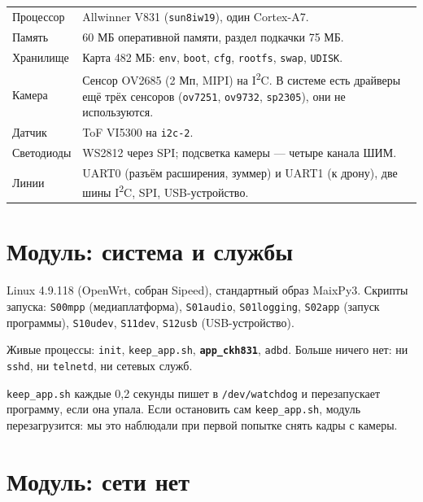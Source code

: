 \begin{tabularx}{\textwidth}{@{}p{3.3cm} Y@{}}
\toprule
{} &  \\ \midrule
Процессор & Allwinner V831 (\texttt{sun8iw19}), один Cortex-A7. \pr{} \\
Память & 60 МБ оперативной памяти, раздел подкачки 75 МБ. \pr{} \\
Хранилище & Карта 482 МБ: \texttt{env}, \texttt{boot}, \texttt{cfg}, \texttt{rootfs}, \texttt{swap}, \texttt{UDISK}. \pr{} \\
Камера & Сенсор OV2685 (2 Мп, MIPI) на I\textsuperscript{2}C. В системе есть драйверы ещё трёх сенсоров (\texttt{ov7251}, \texttt{ov9732}, \texttt{sp2305}), они не используются. \pr{} \\
Датчик & ToF VI5300 на \texttt{i2c-2}. \pr{} \\
Светодиоды & WS2812 через SPI; подсветка камеры --- четыре канала ШИМ. \pr{} \\
Линии & UART0 (разъём расширения, зуммер) и UART1 (к дрону), две шины I\textsuperscript{2}C, SPI, USB-устройство. \pr{} \\ \bottomrule
\end{tabularx}

\section{Модуль: система и службы}

Linux 4.9.118 (OpenWrt, собран Sipeed), стандартный образ MaixPy3. Скрипты запуска: \texttt{S00mpp} (медиаплатформа), \texttt{S01audio}, \texttt{S01logging}, \texttt{S02app} (запуск программы), \texttt{S10udev}, \texttt{S11dev}, \texttt{S12usb} (USB-устройство). \pr{}

Живые процессы: \texttt{init}, \texttt{keep\_app.sh}, \textbf{\texttt{app\_ckh831}}, \texttt{adbd}. Больше ничего нет: ни \texttt{sshd}, ни \texttt{telnetd}, ни сетевых служб.

\begin{zametka}
\texttt{keep\_app.sh} каждые 0,2 секунды пишет в \texttt{/dev/watchdog} и перезапускает программу, если она упала. Если остановить сам \texttt{keep\_app.sh}, модуль перезагрузится: мы это наблюдали при первой попытке снять кадры с камеры. \pr{}
\end{zametka}

\section{Модуль: сети нет}

